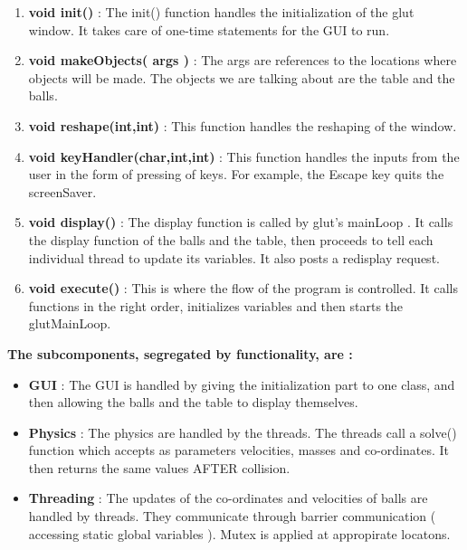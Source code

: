 \documentclass[]{article}
\begin{document}
\begin{itemize}
\begin{flushleft}
\begin{enumerate}
\item \textbf{void init()} : The init() function handles the initialization of the glut window. It takes care of one-time statements for the GUI to run.

\item \textbf{void makeObjects( args )} : The args are references to the locations where objects will be made. The objects we are talking about are the table and the balls. 

\item \textbf{void reshape(int,int)} : This function handles the reshaping of the window.

\item \textbf{void keyHandler(char,int,int)} : This function handles the inputs from the user in the form of pressing of keys. For example, the Escape key quits the screenSaver.

\item \textbf{void display()} : The display function is called by glut's mainLoop . It calls the display function of the balls and the table, then proceeds to tell each individual thread to update its variables. It also posts a redisplay request.

\item \textbf{void execute()} : This is where the flow of the program is controlled. It calls functions in the right order, initializes variables and then starts the glutMainLoop.

\end{enumerate}


\textbf{The subcomponents, segregated by functionality, are :}

\begin{itemize}

\item \textbf{GUI} : The GUI is handled by giving the initialization part to one class, and then allowing the balls and the table to display themselves.

\item \textbf{Physics} : The physics are handled by the threads. The threads call a solve() function which accepts as parameters velocities, masses and co-ordinates. It then returns the same values AFTER collision.

\item \textbf{Threading} : The updates of the co-ordinates and velocities of balls are handled by threads. They communicate through barrier communication ( accessing static global variables ). Mutex is applied at appropirate locatons.

\end{itemize}

 

\end{flushleft}

\end{itemize}
\end{document}
